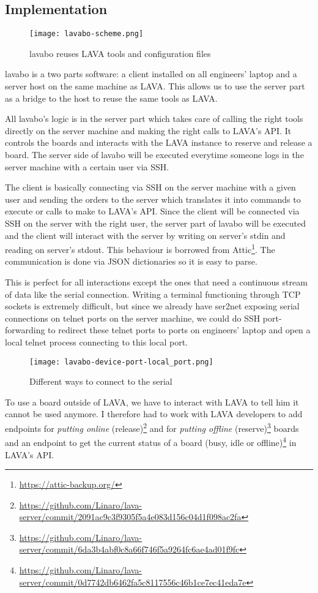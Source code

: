 \subsection{Implementation}

\begin{figure}[H]
  \texttt{[image: lavabo-scheme.png]}
  \caption{lavabo reuses LAVA tools and configuration files}
\end{figure}

lavabo is a two parts software: a client installed on all engineers' laptop and a server host on the same machine as LAVA. This allows us to use the server part as a bridge to the host to reuse the same tools as LAVA.

All lavabo's logic is in the server part which takes care of calling the right tools directly on the server machine and making the right calls to LAVA's API. It controls the boards and interacts with the LAVA instance to reserve and release a board. The server side of lavabo will be executed everytime someone logs in the server machine with a certain user via SSH.

The client is basically connecting via SSH on the server machine with a given user and sending the orders to the server which translates it into commands to execute or calls to make to LAVA's API. Since the client will be connected via SSH on the server with the right user, the server part of lavabo will be executed and the client will interact with the server by writing on server's stdin and reading on server's stdout. This behaviour is borrowed from Attic\footnote{\url{https://attic-backup.org/}}. The communication is done via JSON dictionaries so it is easy to parse.

This is perfect for all interactions except the ones that need a continuous stream of data like the serial connection. Writing a terminal functioning through TCP sockets is extremely difficult, but since we already have ser2net exposing serial connections on telnet ports on the server machine, we could do SSH port-forwarding to redirect these telnet ports to ports on engineers' laptop and open a local telnet process connecting to this local port.

\begin{figure}[H]
  \texttt{[image: lavabo-device-port-local\_port.png]}
  \caption{Different ways to connect to the serial}
\end{figure}

To use a board outside of LAVA, we have to interact with LAVA to tell him it cannot be used anymore. I therefore had to work with LAVA developers to add endpoints for \textit{putting online} (release)\footnote{\url{https://github.com/Linaro/lava-server/commit/2091ac9c3f9305f5a4e083d156c04d1f098ac2fa}} and for \textit{putting offline} (reserve)\footnote{\url{https://github.com/Linaro/lava-server/commit/6da3b4abf0c8a66f746f5a9264fc6ae4ad01f9fc}} boards and an endpoint to get the current status of a board (busy, idle or offline)\footnote{\url{https://github.com/Linaro/lava-server/commit/0d7742db6462fa5c8117556c46b1ce7ec41eda7e}} in LAVA's API.


